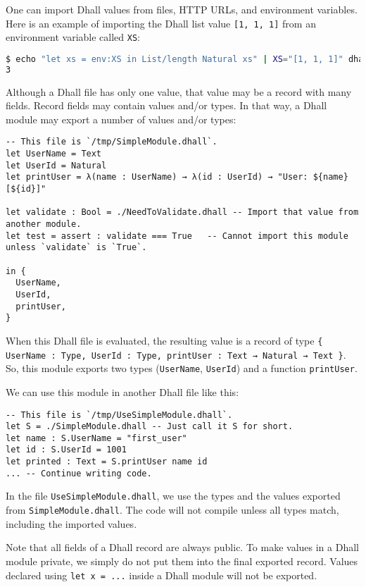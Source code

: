 One can import Dhall values from files, HTTP URLs, and environment variables.
Here is an example of importing the Dhall list value \lstinline![1, 1, 1]! from an environment variable called \lstinline!XS!:


\begin{lstlisting}[language=Bash]
$ echo "let xs = env:XS in List/length Natural xs" | XS="[1, 1, 1]" dhall
3
\end{lstlisting}


Although a Dhall file has only one value, that value may be a record with many fields.
Record fields may contain values and/or types.
In that way, a Dhall module may export a number of values and/or types:


\begin{lstlisting}[language=Dhall]
-- This file is `/tmp/SimpleModule.dhall`.
let UserName = Text
let UserId = Natural
let printUser = λ(name : UserName) → λ(id : UserId) → "User: ${name}[${id}]"

let validate : Bool = ./NeedToValidate.dhall -- Import that value from another module.
let test = assert : validate === True   -- Cannot import this module unless `validate` is `True`.

in {
  UserName,
  UserId,
  printUser,
}
\end{lstlisting}


When this Dhall file is evaluated, the resulting value is a record of type \lstinline!{ UserName : Type, UserId : Type, printUser : Text → Natural → Text }!.
So, this module exports two types (\lstinline!UserName!, \lstinline!UserId!) and a function \lstinline!printUser!.


We can use this module in another Dhall file like this:


\begin{lstlisting}[language=Dhall]
-- This file is `/tmp/UseSimpleModule.dhall`.
let S = ./SimpleModule.dhall -- Just call it S for short.
let name : S.UserName = "first_user"
let id : S.UserId = 1001
let printed : Text = S.printUser name id
... -- Continue writing code.
\end{lstlisting}


In the file \lstinline!UseSimpleModule.dhall!, we use the types and the values exported from \lstinline!SimpleModule.dhall!.
The code will not compile unless all types match, including the imported values.


Note that all fields of a Dhall record are always public.
To make values in a Dhall module private, we simply do not put them into the final exported record.
Values declared using \lstinline!let x = ...! inside a Dhall module will not be exported.


